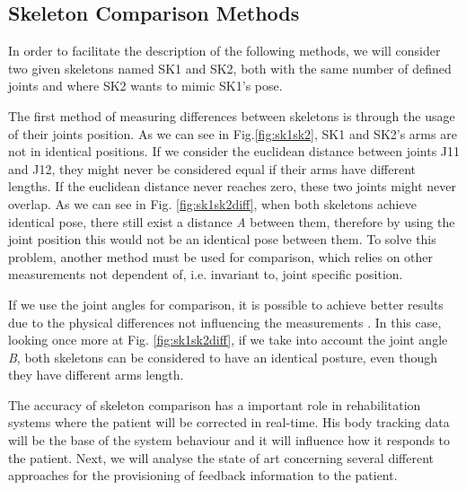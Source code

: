 \subsection{Skeleton Comparison Methods}
\label{sec:skeletoncomparison}
In order to facilitate the description of the following methods, we will consider two given skeletons named SK1 and SK2, both with the same number of defined joints and where SK2 wants to mimic SK1's pose.

The first method of measuring differences between skeletons is through the usage of their joints position. 
As we can see in Fig.\ref{fig:sk1sk2}, SK1 and SK2's arms are not in identical positions. 
If we consider the euclidean distance between joints J11 and J12, they might never be considered equal if their arms have different lengths. 
If the euclidean distance never reaches zero, these two joints might never overlap. As we can see in Fig. \ref{fig:sk1sk2diff}, 
when both skeletons achieve identical pose, there still exist a distance \textit{A} between them, therefore by using the joint position 
this would not be an identical pose between them.
To solve this problem, another method must be used for comparison, 
which relies on other measurements not dependent of, i.e. invariant to, joint specific position. 

If we use the joint angles for comparison, it is possible to achieve better results due to 
the physical differences not influencing the measurements \cite{Borghese2013}. 
In this case, looking once more at Fig. \ref{fig:sk1sk2diff}, 
if we take into account the joint angle \textit{B}, both skeletons can be considered to have an identical posture, even though they have different arms length.

The accuracy of skeleton comparison has a important role in rehabilitation systems 
where the patient will be corrected in real-time. His body tracking data will be the 
base of the system behaviour and it will influence how it responds to the patient. 
Next, we will analyse the state of art concerning several different approaches for 
the provisioning of feedback information to the patient.

